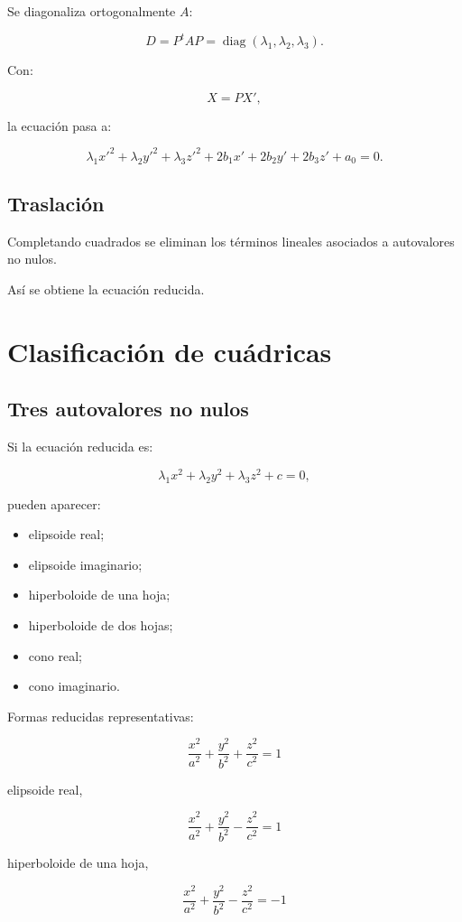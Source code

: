 \documentclass[11pt,a4paper]{article}
\newcommand{\diag}{\operatorname{diag}}
\begin{document}
Se diagonaliza ortogonalmente $A$:

\[
\boxed{
D=P^tAP
=
\diag(\lambda_1,\lambda_2,\lambda_3).
}
\]

Con:

\[
X=PX',
\]

la ecuación pasa a:

\[
\lambda_1x'^2+\lambda_2y'^2+\lambda_3z'^2
+2b_1x'+2b_2y'+2b_3z'+a_0=0.
\]

\subsection{Traslación}

Completando cuadrados se eliminan los términos lineales asociados a autovalores no nulos.

Así se obtiene la ecuación reducida.

\section{Clasificación de cuádricas}

\subsection{Tres autovalores no nulos}

Si la ecuación reducida es:

\[
\lambda_1x^2+\lambda_2y^2+\lambda_3z^2+c=0,
\]

pueden aparecer:

\begin{itemize}
\item elipsoide real;
\item elipsoide imaginario;
\item hiperboloide de una hoja;
\item hiperboloide de dos hojas;
\item cono real;
\item cono imaginario.
\end{itemize}

Formas reducidas representativas:

\[
\boxed{
\frac{x^2}{a^2}
+
\frac{y^2}{b^2}
+
\frac{z^2}{c^2}
=
1
}
\]

elipsoide real,

\[
\boxed{
\frac{x^2}{a^2}
+
\frac{y^2}{b^2}
-
\frac{z^2}{c^2}
=
1
}
\]

hiperboloide de una hoja,

\[
\boxed{
\frac{x^2}{a^2}
+
\frac{y^2}{b^2}
-
\frac{z^2}{c^2}
=
-1
}
\]
\end{document}
